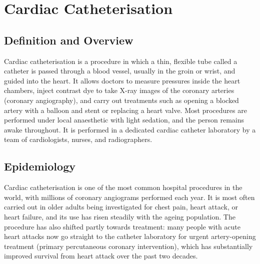 \chapter{Cardiac Catheterisation}

\section*{Definition and Overview}
Cardiac catheterisation is a procedure in which a thin, flexible tube called a catheter is passed through a blood vessel, usually in the groin or wrist, and guided into the heart. It allows doctors to measure pressures inside the heart chambers, inject contrast dye to take X-ray images of the coronary arteries (coronary angiography), and carry out treatments such as opening a blocked artery with a balloon and stent or replacing a heart valve. Most procedures are performed under local anaesthetic with light sedation, and the person remains awake throughout. It is performed in a dedicated cardiac catheter laboratory by a team of cardiologists, nurses, and radiographers.

\section*{Epidemiology}
Cardiac catheterisation is one of the most common hospital procedures in the world, with millions of coronary angiograms performed each year. It is most often carried out in older adults being investigated for chest pain, heart attack, or heart failure, and its use has risen steadily with the ageing population. The procedure has also shifted partly towards treatment: many people with acute heart attacks now go straight to the catheter laboratory for urgent artery-opening treatment (primary percutaneous coronary intervention), which has substantially improved survival from heart attack over the past two decades.

